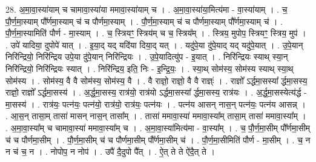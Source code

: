 \documentclass[17pt]{extarticle}
\begin{document}
28. अ॒मा॒वा॒स्या॑याम् च चामावा॒स्या॑या ममावा॒स्या॑याम् च । . अ॒मा॒वा॒स्या॑या॒मित्य॑मा - वा॒स्या॑याम् । . च॒ पौ॒र्ण॒मा॒स्याम् पौ᳚र्णमा॒स्याम् च॑ च पौर्णमा॒स्याम् । . पौ॒र्ण॒मा॒स्याम् च॑ च पौर्णमा॒स्याम् पौ᳚र्णमा॒स्याम् च॑ । . पौ॒र्ण॒मा॒स्यामिति॑ पौर्ण - मा॒स्याम् । . च॒ स्त्रियꣳ॒॒ स्त्रिय॑म् च च॒ स्त्रिय᳚म् । . स्त्रिय॒ मुपोप॒ स्त्रियꣳ॒॒ स्त्रिय॒ मुप॑ । . उपे॑ यादिया॒ दुपोपे॑ यात् । . इ॒या॒द् यद् यदि॑या दिया॒द् यत् । . यदु॑पे॒या दु॑पे॒याद् यद् यदु॑पे॒यात् । . उ॒पे॒यान् निरि॑न्द्रियो॒ निरि॑न्द्रिय उपे॒या दु॑पे॒यान् निरि॑न्द्रियः । . उ॒पे॒यादित्यु॑प - इ॒यात् । . निरि॑न्द्रियः स्याथ् स्या॒न् निरि॑न्द्रियो॒ निरि॑न्द्रियः स्यात् । . निरि॑न्द्रिय॒ इति॒ निः - इ॒न्द्रि॒यः॒ । . स्या॒थ् सोम॑स्य॒ सोम॑स्य स्याथ् स्या॒थ् सोम॑स्य । . सोम॑स्य॒ वै वै सोम॑स्य॒ सोम॑स्य॒ वै । . वै राज्ञो॒ राज्ञो॒ वै वै राज्ञ्ः॑ । . राज्ञो᳚ ऽर्द्धमा॒सस्या᳚ र्द्धमा॒सस्य॒ राज्ञो॒ राज्ञो᳚ ऽर्द्धमा॒सस्य॑ । . अ॒र्द्ध॒मा॒सस्य॒ रात्र॑यो॒ रात्र॑यो ऽर्द्धमा॒सस्या᳚ र्द्धमा॒सस्य॒ रात्र॑यः । . अ॒र्द्ध॒मा॒सस्येत्य॑र्द्ध - मा॒सस्य॑ । . रात्र॑यः॒ पत्न॑यः॒ पत्न॑यो॒ रात्र॑यो॒ रात्र॑यः॒ पत्न॑यः । . पत्न॑य आसन् नास॒न् पत्न॑यः॒ पत्न॑य आसन्न् । . आ॒स॒न् तासा॒म् तासा॑ मासन् नास॒न् तासा᳚म् । . तासा॑ ममावा॒स्या॑ ममावा॒स्या᳚म् तासा॒म् तासा॑ ममावा॒स्या᳚म् । . अ॒मा॒वा॒स्या᳚म् च चामावा॒स्या॑ ममावा॒स्या᳚म् च । . अ॒मा॒वा॒स्या॑मित्य॑मा - वा॒स्या᳚म् । . च॒ पौ॒र्ण॒मा॒सीम् पौ᳚र्णमा॒सीम् च॑ च पौर्णमा॒सीम् । . पौ॒र्ण॒मा॒सीम् च॑ च पौर्णमा॒सीम् पौ᳚र्णमा॒सीम् च॑ । . पौ॒र्ण॒मा॒सीमिति॑ पौर्ण - मा॒सीम् । . च॒ न न च॑ च॒ न । . नोपोप॒ न नोप॑ । . उपै॑ दै॒दुपो पै᳚त् । . ऐ॒त् ते ते ऐ॑दै॒त् ते । \newline
\end{document}
